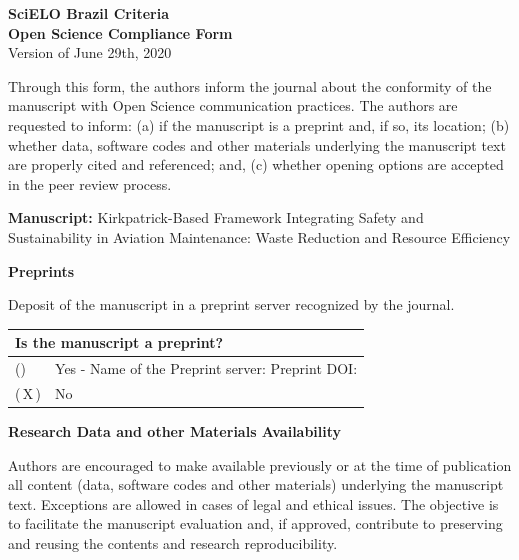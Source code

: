 \documentclass[12pt,a4paper]{article}
\newcommand{\cb}{(\hspace{0.9em})}
\newcommand{\cx}{(\,X\,)}
\begin{document}
\begin{center}
{\large\bfseries SciELO Brazil Criteria}\\[2pt]
{\large\bfseries Open Science Compliance Form}\\[2pt]
Version of June 29th, 2020
\end{center}

Through this form, the authors inform the journal about the conformity of the manuscript with Open Science communication practices. The authors are requested to inform: (a) if the manuscript is a preprint and, if so, its location; (b) whether data, software codes and other materials underlying the manuscript text are properly cited and referenced; and, (c) whether opening options are accepted in the peer review process.

\textbf{Manuscript:} Kirkpatrick-Based Framework Integrating Safety and Sustainability in Aviation Maintenance: Waste Reduction and Resource Efficiency

\textbf{Preprints}

Deposit of the manuscript in a preprint server recognized by the journal.

\begin{tabularx}{\textwidth}{|p{1.2cm}|X|}
\hline
\multicolumn{2}{|l|}{Is the manuscript a preprint?} \\
\hline
\cb & Yes - Name of the Preprint server: \newline Preprint DOI: \\
\hline
\cx & No \\
\hline
\end{tabularx}

\textbf{Research Data and other Materials Availability}

Authors are encouraged to make available previously or at the time of publication all content (data, software codes and other materials) underlying the manuscript text. Exceptions are allowed in cases of legal and ethical issues. The objective is to facilitate the manuscript evaluation and, if approved, contribute to preserving and reusing the contents and research reproducibility.
\end{document}
